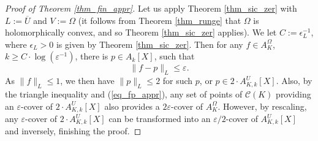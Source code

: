 \documentclass[12pt]{article}
\numberwithin{equation}{section}
\theoremstyle{theorem}
\theoremstyle{definition}
\theoremstyle{remark}
\begin{document}
	\begin{proof}[Proof of Theorem \ref{thm_fin_appr}]
		Let us apply Theorem \ref{thm_sic_zer} with $L := \overline{U}$ and $V := \Omega$ (it follows from Theorem \ref{thm_runge} that $\Omega$ is holomorphically convex, and so Theorem \ref{thm_sic_zer} applies).
		We let $C := \epsilon_L^{-1}$, where $\epsilon_L > 0$ is given by Theorem \ref{thm_sic_zer}. 
		Then for any $f \in A_K^{\Omega}$, $k \geq C \cdot \log (\varepsilon^{-1})$, there is $p \in A_k[X]$, such that
		\begin{equation}\label{eq_fp_appr}
			\| f - p \|_{L}
			\leq
			\varepsilon.
		\end{equation}
		As $\| f \|_{L} \leq 1$, we then have $\| p \|_{L} \leq 2$ for such $p$, or $p \in 2 \cdot A_{K, k}^{U}[X]$.
		Also, by the triangle inequality and (\ref{eq_fp_appr}), any set of points of $\mathscr{C}(K)$ providing an $\varepsilon$-cover of $2 \cdot A_{K, k}^{U}[X]$ also provides a $2 \varepsilon$-cover of $A_K^{\Omega}$.
		However, by rescaling, any $\varepsilon$-cover of $2 \cdot A_{K, k}^{U}[X]$ can be transformed into an $\varepsilon/2$-cover of $A_{K, k}^{U}[X]$ and inversely, finishing the proof.
	\end{proof}
	
\end{document}
